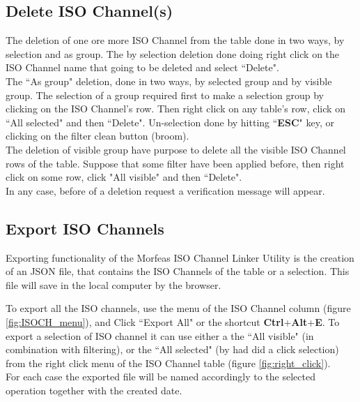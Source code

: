 \newpage
\subsection{Delete ISO Channel(s)}
The deletion of one ore more ISO Channel from the table done in two ways, by selection and as group.
The by selection deletion done doing right click on the ISO Channel name that going to be deleted and select ``Delete".\\

The ``As group" deletion, done in two ways, by selected group and by visible group.
The selection of a group required first to make a selection group by clicking on the ISO Channel's row.
Then right click on any table's row, click on ``All selected" and then ``Delete".
Un-selection done by hitting ``\textbf{ESC}" key, or clicking on the filter clean button (broom).\\

The deletion of visible group have purpose to delete all the visible ISO Channel rows of the table.
Suppose that some filter have been applied before, then right click on some row, click "All visible" and then ``Delete".\\

In any case, before of a deletion request a verification message will appear.

\subsection{Export ISO Channels}
Exporting functionality of the Morfeas ISO Channel Linker Utility is the creation of an JSON file,
that contains the ISO Channels of the table or a selection. This file will save in the local computer by the browser.

To export all the ISO channels, use the menu of the ISO Channel column (figure \ref{fig:ISOCH_menu}),
 and Click ``Export All" or the shortcut \textbf{Ctrl}+\textbf{Alt}+\textbf{E}.
To export a selection of ISO channel it can use either a the ``All visible" (in combination with filtering),
or the ``All selected" (by had did a click selection) from the right click menu of the ISO Channel table (figure \ref{fig:right_click}).\\

For each case the exported file will be named accordingly to the selected operation together with the created date.

